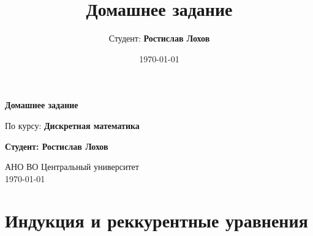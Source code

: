 \documentclass[a4paper,12pt]{article}
\title{Домашнее задание}
\author{Студент: \textbf{Ростислав Лохов}}
\date{\today}
\begin{document}
\begin{titlepage}
    \centering
    \vspace*{1cm}

    \Huge
    \textbf{Домашнее задание}

    \vspace{0.5cm}
    \LARGE
    По курсу: \textbf{Дискретная математика}

    \vspace{1.5cm}

    \textbf{Студент: Ростислав Лохов}

    \vfill

    \Large
    АНО ВО Центральный университет\\
    \vspace{0.3cm}
    \today

\end{titlepage}

\tableofcontents
\newpage

\section{Индукция и реккурентные уравнения}
\end{document}
